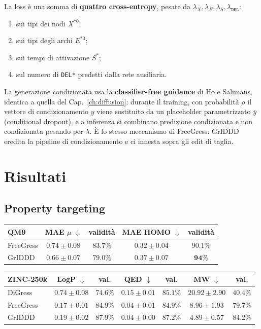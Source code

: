 La loss è una somma di \textbf{quattro cross-entropy}, pesate da $\lambda_X, \lambda_E, \lambda_S, \lambda_{\texttt{DEL}}$:
\begin{enumerate}[leftmargin=2em]
  \item sui tipi dei nodi $X^{*0}$;
  \item sui tipi degli archi $E^{*0}$;
  \item sui tempi di attivazione $S^*$;
  \item sul numero di \texttt{DEL*} predetti dalla rete ausiliaria.
\end{enumerate}

La generazione condizionata usa la \textbf{classifier-free guidance} di Ho e Salimans, identica a quella del Cap.~\ref{ch:diffusion}: durante il training, con probabilità $\rho$ il vettore di condizionamento $y$ viene sostituito da un placeholder parametrizzato $\bar y$ (conditional dropout), e a inferenza si combinano predizione condizionata e non condizionata pesando per $\lambda$. È lo stesso meccanismo di FreeGress: GrIDDD eredita la pipeline di condizionamento e ci innesta sopra gli edit di taglia.

\section{Risultati}

\subsection{Property targeting}

\begin{center}
\begin{tabular}{lcccc}
\toprule
\textbf{QM9} & MAE $\mu$ $\downarrow$ & validità & MAE HOMO $\downarrow$ & validità \\
\midrule
FreeGress & $0.74 \pm 0.08$ & $83.7\%$ & $\mathbf{0.32} \pm 0.04$ & $90.1\%$ \\
GrIDDD    & $\mathbf{0.66} \pm 0.07$ & $79.0\%$ & $0.37 \pm 0.07$ & $\mathbf{94\%}$ \\
\bottomrule
\end{tabular}
\end{center}

\begin{center}
\begin{tabular}{lcccccc}
\toprule
\textbf{ZINC-250k} & LogP $\downarrow$ & val. & QED $\downarrow$ & val. & MW $\downarrow$ & val. \\
\midrule
DiGress   & $0.74 \pm 0.08$ & $74.6\%$ & $0.15 \pm 0.01$ & $85.1\%$ & $20.92 \pm 2.90$ & $40.4\%$ \\
FreeGress & $\mathbf{0.17} \pm 0.01$ & $84.9\%$ & $\mathbf{0.04} \pm 0.01$ & $84.9\%$ & $8.96 \pm 1.93$ & $79.7\%$ \\
GrIDDD    & $0.19 \pm 0.02$ & $\mathbf{87.9\%}$ & $\mathbf{0.04} \pm 0.00$ & $\mathbf{87.2\%}$ & $\mathbf{4.89} \pm 0.57$ & $\mathbf{84.2\%}$ \\
\bottomrule
\end{tabular}
\end{center}

